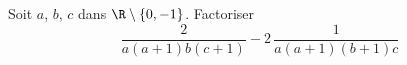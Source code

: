 Soit $a$, $b$, $c$ dans $\R \setminus\left\lbrace 0,-1\right\rbrace$. Factoriser
\[
 \frac{2}{a(a+1)b(c+1)} - 2\,\frac{1}{a(a+1)(b+1)c}
\]
\bigskip \bigskip